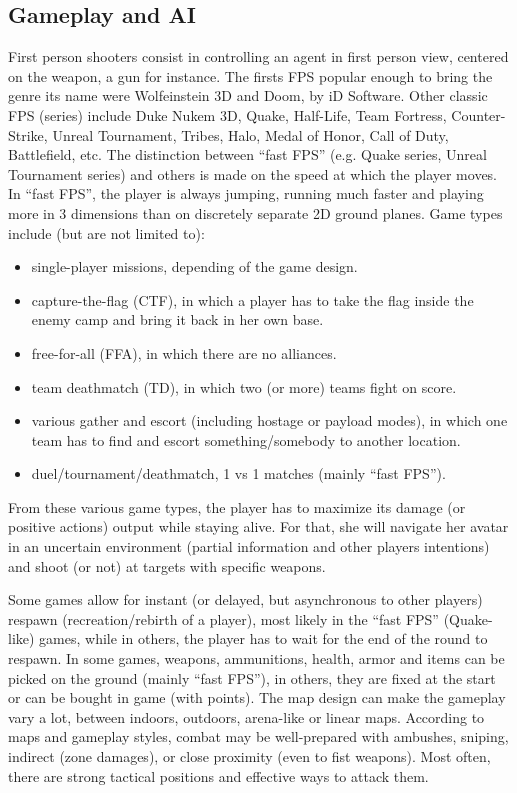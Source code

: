 \subsection{Gameplay and AI}
First person shooters  consist in controlling an agent in first person view, centered on the weapon, a gun for instance. The firsts FPS popular enough to bring the genre its name were Wolfeinstein 3D and Doom, by iD Software. Other classic FPS (series) include Duke Nukem 3D, Quake, Half-Life, Team Fortress, Counter-Strike, Unreal Tournament, Tribes, Halo, Medal of Honor, Call of Duty, Battlefield, etc. The distinction between ``fast FPS'' (e.g. Quake series, Unreal Tournament series) and others is made on the speed at which the player moves. In ``fast FPS'', the player is always jumping, running much faster and playing more in 3 dimensions than on discretely separate 2D ground planes. Game types include (but are not limited to):
\begin{itemize}
    \item single-player missions, depending of the game design.
    \item capture-the-flag (CTF), in which a player has to take the flag inside the enemy camp and bring it back in her own base.
    \item free-for-all (FFA), in which there are no alliances.
    \item team deathmatch (TD), in which two (or more) teams fight on score.
    \item various gather and escort (including hostage or payload modes), in which one team has to find and escort something/somebody to another location.
    \item duel/tournament/deathmatch, 1 vs 1 matches (mainly ``fast FPS'').
\end{itemize}
From these various game types, the player has to maximize its damage (or positive actions) output while staying alive. For that, she will navigate her avatar in an uncertain environment (partial information and other players intentions) and shoot (or not) at targets with specific weapons.

Some games allow for instant (or delayed, but asynchronous to other players) respawn (recreation/rebirth of a player), most likely in the ``fast FPS'' (Quake-like) games, while in others, the player has to wait for the end of the round to respawn. In some games, weapons, ammunitions, health, armor and items can be picked on the ground (mainly ``fast FPS''), in others, they are fixed at the start or can be bought in game (with points). The map design can make the gameplay vary a lot, between indoors, outdoors, arena-like or linear maps. According to maps and gameplay styles, combat may be well-prepared with ambushes, sniping, indirect (zone damages), or close proximity (even to fist weapons). Most often, there are strong tactical positions and effective ways to attack them. 

